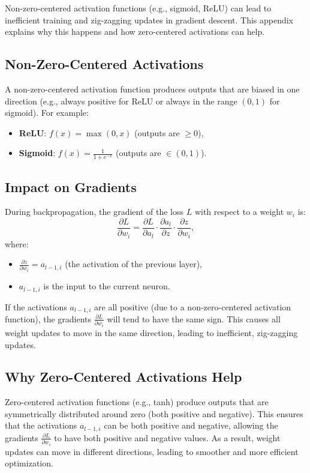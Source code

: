\begin{notechapter}
Non-zero-centered activation functions (e.g., sigmoid, ReLU) can lead to 
inefficient training and zig-zagging updates in gradient descent. This 
appendix explains why this happens and how zero-centered activations 
can help.

\subsection{Non-Zero-Centered Activations}
A non-zero-centered activation function produces outputs that are 
biased in one direction (e.g., always positive for ReLU or always in 
the range \( (0, 1) \) for sigmoid). For example:
\begin{itemize}
    \item \textbf{ReLU}: \( f(x) = \max(0, x) \) (outputs are \( \geq 0 \)),
    \item \textbf{Sigmoid}: \( f(x) = \frac{1}{1 + e^{-x}} \) (outputs are \( \in (0, 1) \)).
\end{itemize}

\subsection{Impact on Gradients}
During backpropagation, the gradient of the loss \( L \) with respect 
to a weight \( w_i \) is:
\[
\frac{\partial L}{\partial w_i} = \frac{\partial L}{\partial a_l} \cdot \frac{\partial a_l}{\partial z} \cdot \frac{\partial z}{\partial w_i},
\]
where:
\begin{itemize}
    \item \( \frac{\partial z}{\partial w_i} = a_{l-1,i} \) (the activation of the previous layer),
    \item \( a_{l-1,i} \) is the input to the current neuron.
\end{itemize}

If the activations \( a_{l-1,i} \) are all positive (due to a non-zero-centered 
activation function), the gradients \( \frac{\partial L}{\partial w_i} \) will 
tend to have the same sign. This causes all weight updates to move in the 
same direction, leading to inefficient, zig-zagging updates.

\subsection{Why Zero-Centered Activations Help}
Zero-centered activation functions (e.g., tanh) produce outputs that are 
symmetrically distributed around zero (both positive and negative). This 
ensures that the activations \( a_{l-1,i} \) can be both positive and negative, 
allowing the gradients \( \frac{\partial L}{\partial w_i} \) to have both 
positive and negative values. As a result, weight updates can move in 
different directions, leading to smoother and more efficient optimization.


\end{notechapter}
